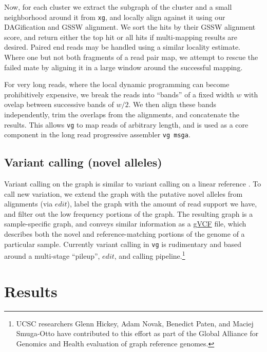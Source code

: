 \documentclass{article}
\begin{document}
Now, for each cluster we extract the subgraph of the cluster and a small neighborhood around it from {\tt xg}, and locally align against it using our DAGification and GSSW alignment.
We sort the hits by their GSSW alignment score, and return either the top hit or all hits if multi-mapping results are desired.
Paired end reads may be handled using a similar locality estimate.
Where one but not both fragments of a read pair map, we attempt to rescue the failed mate by aligning it in a large window around the successful mapping.

For very long reads, where the local dynamic programming can become prohibitively expensive, we break the reads into ``bands'' of a fixed width $w$ with ovelap between successive bands of $w/2$.
We then align these bands independently, trim the overlaps from the alignments, and concatenate the results.
This allows {\tt vg} to map reads of arbitrary length, and is used as a core component in the long read progressive assembler {\tt vg msga}.

\subsection{Variant calling (novel alleles)}

Variant calling on the graph is similar to variant calling on a linear reference \cite{samtools, garrison2012haplotype}.
To call new variation, we extend the graph with the putative novel alleles from alignments (via $edit$), label the graph with the amount of read support we have, and filter out the low frequency portions of the graph.
The resulting graph is a sample-specific graph, and conveys similar information as a \href{http://samtools.github.io/hts-specs/VCFv4.2.pdf}{gVCF} file, which describes both the novel and reference-matching portions of the genome of a particular sample.
Currently variant calling in {\tt vg} is rudimentary and based around a multi-stage ``pileup'', $edit$, and calling pipeline.\footnote{UCSC researchers Glenn Hickey, Adam Novak, Benedict Paten, and Maciej Smuga-Otto have contributed to this effort as part of the Global Alliance for Genomics and Health evaluation of graph reference genomes.}


\section{Results}
\end{document}
